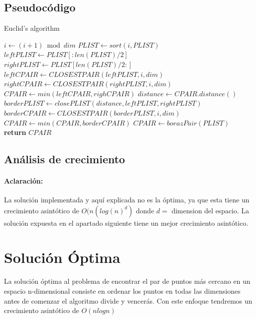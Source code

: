 \documentclass{article}
\begin{document}
	\subsection{Pseudocódigo}
		\begin{algorithm}

			\caption{Euclid’s algorithm}

			\label{euclid}

			\begin{algorithmic}[1] %

					\State $i\gets(i+1) \bmod dim$
					\State $PLIST \gets sort(i, PLIST)$
					\State $leftPLIST \gets PLIST[:len(PLIST)/2]$
					\State $rightPLIST \gets PLIST[len(PLIST)/2:]$
					\State $leftCPAIR \gets CLOSESTPAIR(leftPLIST, i, dim)$
					\State $rightCPAIR \gets CLOSESTPAIR(rightPLIST, i, dim)$
					\State $CPAIR \gets min(leftCPAIR, righCPAIR)$
					\State $distance \gets CPAIR.distance()$
					\State $borderPLIST \gets closePLIST(distance, leftPLIST, rightPLIST)$
					\State $borderCPAIR \gets CLOSESTPAIR(borderPLIST, i , dim)$
					\State $CPAIR \gets min(CPAIR, borderCPAIR)$
				\Else
					\State $CPAIR \gets borazPair(PLIST)$
				\EndIf
				\State \textbf{return} $CPAIR$
			\EndProcedure

			\end{algorithmic}

		\end{algorithm}
	\subsection{Análisis de crecimiento}

	\paragraph{Aclaración:}
	La solución implementada y aquí explicada no es la óptima, ya que esta tiene un crecimiento asintótico de $O(n(log(n)^d)$ donde $d = $ dimension del espacio. La solución expuesta en el apartado siguiente tiene un mejor crecimiento asintótico.
		
\section{Solución Óptima}
	\paragraph{}
	La solución óptima al problema de encontrar el par de puntos más cercano en un espacio n-dimensional consiste en ordenar los puntos en todas las dimensiones antes de comenzar el algoritmo divide y vencerás. Con este enfoque tendremos un crecimiento asintótico de $O(nlogn)$
\end{document}
